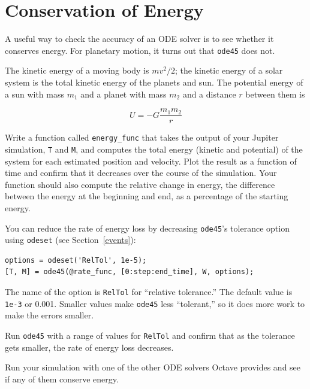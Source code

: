 \documentclass{book}
\begin{document}
\section{Conservation of Energy}

A useful way to check the accuracy of an ODE solver is to
see whether it conserves energy. For planetary
motion, it turns out that {\tt ode45} does not.

The kinetic energy of a moving body is $m v^2 / 2$; the
kinetic energy of a solar system is the total kinetic
energy of the planets and sun.
The potential energy of a sun with mass $m_1$ and a
planet with mass $m_2$ and a distance $r$ between them is

\[ U = -G \frac{m_1 m_2}{r} \]
%

\begin{ex}
Write a function called {\tt energy\_func} that takes the output of
your Jupiter simulation, {\tt T} and {\tt M}, and computes the total
energy (kinetic and potential) of the system for each estimated
position and velocity. Plot the result as a function of time and
confirm that it decreases over the course of the simulation. Your
function should also compute the relative change in energy, the
difference between the energy at the beginning and end, as a
percentage of the starting energy.
\end{ex}

You can reduce the rate of energy loss by decreasing {\tt ode45}'s
tolerance option using {\tt odeset} (see Section~\ref{events}):

\begin{verbatim}
options = odeset('RelTol', 1e-5);
[T, M] = ode45(@rate_func, [0:step:end_time], W, options);
\end{verbatim}
%
The name of the option is {\tt RelTol} for ``relative tolerance.''
The default value is {\tt 1e-3} or 0.001. Smaller values
make {\tt ode45} less ``tolerant,'' so it does more work to
make the errors smaller. 

\begin{ex}
Run {\tt ode45} with a range of values for {\tt RelTol} and confirm
that as the tolerance gets smaller, the rate of energy loss
decreases.
\end{ex}

\begin{ex}
Run your simulation with one of the other ODE solvers Octave provides
and see if any of them conserve energy.
\end{ex}

\end{document}
